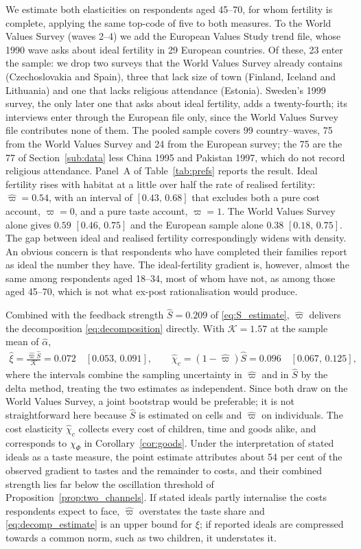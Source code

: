 \documentclass[11pt]{article}
\begin{document}
We estimate both elasticities on respondents aged 45--70, for whom fertility is complete, applying
the same top-code of five to both measures. To the World Values Survey (waves 2--4) we add the
European Values Study trend file, whose 1990 wave asks about ideal fertility in 29 European countries.
Of these, 23 enter the sample: we drop two surveys that the World Values Survey already contains
(Czechoslovakia and Spain), three that lack size of town (Finland, Iceland and Lithuania) and one
that lacks religious attendance (Estonia). Sweden's 1999 survey, the only later one that asks about ideal
fertility, adds a twenty-fourth; its interviews enter through the European file only, since the World
Values Survey file contributes none of them. The pooled sample covers 99 country--waves, 75 from the World Values
Survey and 24 from the European survey; the 75 are the 77 of Section~\ref{sub:data} less China 1995 and
Pakistan 1997, which do not record religious attendance. Panel~A of
Table~\ref{tab:prefs} reports the result. Ideal fertility rises with habitat at a little over half
the rate of realised fertility: $\hat\varpi=0.54$, with an interval of $[0.43,\,0.68]$ that excludes
both a pure cost account, $\varpi=0$, and a pure taste account, $\varpi=1$. The World Values Survey
alone gives $0.59$ $[0.46,\,0.75]$ and the European sample alone $0.38$ $[0.18,\,0.75]$. The gap between ideal and realised fertility correspondingly widens with density. An
obvious concern is that respondents who have completed their families report as ideal the number
they have. The ideal-fertility gradient is, however, almost the same among respondents aged
18--34, most of whom have not, as among those aged 45--70, which is not what ex-post
rationalisation would produce.

Combined with the feedback strength $\hat S=0.209$ of \eqref{eq:S_estimate}, $\hat\varpi$ delivers
the decomposition \eqref{eq:decomposition} directly. With $\mathcal{K}=1.57$ at the sample mean
of $\hat\alpha$,
\begin{align}
\hat\xi=\frac{\hat\varpi\hat S}{\mathcal{K}}=0.072\quad[0.053,\,0.091],
\qquad
\hat\chi_c=(1-\hat\varpi)\hat S=0.096\quad[0.067,\,0.125],
\label{eq:decomp_estimate}
\end{align}
where the intervals combine the sampling uncertainty in $\hat\varpi$ and in $\hat S$ by the delta
method, treating the two estimates as independent. Since both draw on the World Values Survey, a joint
bootstrap would be preferable; it is not straightforward here because $\hat S$ is estimated on cells
and $\hat\varpi$ on individuals. The cost elasticity $\hat\chi_c$ collects every cost of children, time
and goods alike, and corresponds to $\chi_\Phi$ in Corollary~\ref{cor:goods}. Under the interpretation
of stated ideals as a taste measure, the point estimate attributes about 54 per cent of the observed
gradient to tastes and the remainder to costs, and their combined strength lies far below the oscillation threshold of
Proposition~\ref{prop:two_channels}. If stated ideals partly internalise the costs respondents
expect to face, $\hat\varpi$ overstates the taste share and \eqref{eq:decomp_estimate} is an upper
bound for $\xi$; if reported ideals are compressed towards a common norm, such as two children, it
understates it.
\end{document}
